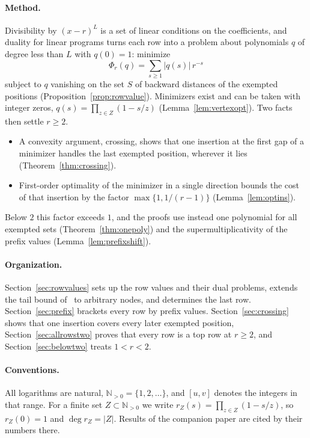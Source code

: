 \documentclass[11pt]{article}
\newcommand{\N}{\mathbb N}
\begin{document}
\paragraph{Method.}
Divisibility by $(x-r)^L$ is a set of linear conditions on the
coefficients, and duality for linear programs turns each row into a problem
about polynomials
$q$ of degree less than $L$ with $q(0)=1$: minimize
\[
  \Phi_r(q)=\sum_{s\ge1}|q(s)|\,r^{-s}
\]
subject to $q$ vanishing on the set $S$ of backward distances of the
exempted positions (Proposition~\ref{prop:rowvalue}).  Minimizers exist
and can be taken with integer zeros, $q(s)=\prod_{z\in Z}(1-s/z)$
(Lemma~\ref{lem:vertexopt}).  Two facts then settle $r\ge2$.
\begin{itemize}
\item A convexity argument, crossing, shows that one insertion at the
first gap of a minimizer handles the last exempted position, wherever it lies
(Theorem~\ref{thm:crossing}).
\item First-order optimality of the minimizer in a single direction bounds
the cost of that insertion by the factor $\max\{1,1/(r-1)\}$
(Lemma~\ref{lem:optins}).
\end{itemize}
Below $2$ this factor exceeds $1$, and the proofs use instead one
polynomial for all exempted sets (Theorem~\ref{thm:onepoly}) and the
supermultiplicativity of the prefix values (Lemma~\ref{lem:prefixshift}).

\paragraph{Organization.}
Section~\ref{sec:rowvalues} sets up the row values and their dual
problems, extends the tail bound of~\cite{coefficient-mass} to arbitrary
nodes, and determines the last row.  Section~\ref{sec:prefix} brackets
every row by prefix values.  Section~\ref{sec:crossing} shows that one
insertion covers every later exempted position,
Section~\ref{sec:allrowstwo} proves that every row is a top row at
$r\ge2$, and Section~\ref{sec:belowtwo} treats $1<r<2$.

\paragraph{Conventions.}
All logarithms are natural, $\N_{>0}=\{1,2,\ldots\}$, and $[u,v]$ denotes
the integers in that range.  For a finite set
$Z\subset\N_{>0}$ we write $r_Z(s)=\prod_{z\in Z}(1-s/z)$, so $r_Z(0)=1$
and $\deg r_Z=|Z|$.  Results of the companion paper are cited by their
numbers there.
\end{document}
